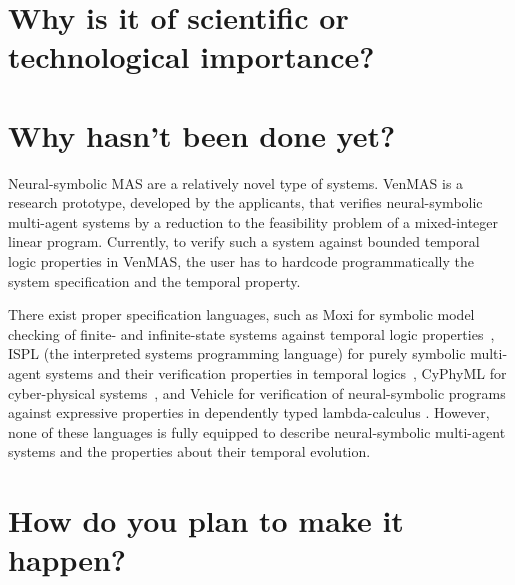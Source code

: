 \documentclass[11pt]{article}
\begin{document}
\section{Why is it of scientific or technological importance?}



\section{Why hasn't been done yet?}



Neural-symbolic MAS are a relatively novel type of systems. VenMAS is
a research prototype, developed by the applicants, that verifies
neural-symbolic multi-agent systems by a reduction to the feasibility
problem of a mixed-integer linear program.  Currently, to verify such
a system against bounded temporal logic properties in VenMAS, the user
has to hardcode programmatically the system specification and the
temporal property.

There exist proper specification languages, such as Moxi for symbolic model
checking of finite- and infinite-state systems against temporal logic
properties~\cite{Rozier+2024}, ISPL (the interpreted systems
programming language) for purely symbolic multi-agent systems and
their verification properties in temporal logics~\cite{LomuscioQR17},
CyPhyML for cyber-physical systems~\cite{Simko+13}, and Vehicle for
verification of neural-symbolic programs against expressive properties
in dependently typed lambda-calculus \cite{Daggitt+24}. However, none
of these languages is fully equipped to describe neural-symbolic
multi-agent systems and the properties about their temporal evolution.


\section{How do you plan to make it happen?}

\end{document}
